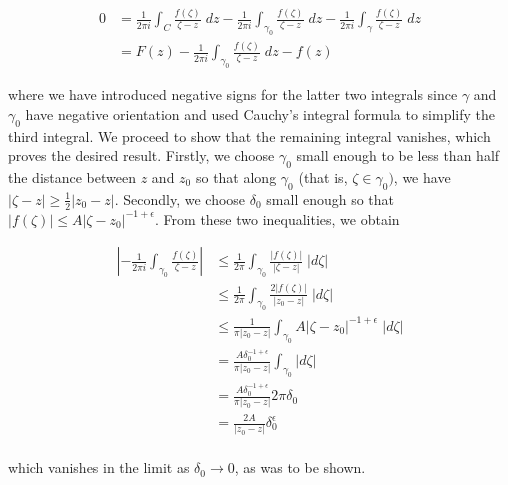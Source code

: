 \begin{solution}
  \begin{align*}
  0 &= \frac{1}{2 \pi i} \int_{C}{\frac{f(\zeta)}{\zeta - z} \; dz} 
     - \frac{1}{2 \pi i} \int_{\gamma_0}{\frac{f(\zeta)}{\zeta - z} \; dz}
     - \frac{1}{2 \pi i} \int_{\gamma}{\frac{f(\zeta)}{\zeta - z} \; dz} \\
    &= F(z) - \frac{1}{2 \pi i} \int_{\gamma_0}{\frac{f(\zeta)}{\zeta - z} \; dz} - f(z)
  \end{align*}

  where we have introduced negative signs for the latter two integrals since $\gamma$ and $\gamma_0$ have negative 
  orientation and used Cauchy's integral formula to simplify the third integral. We proceed to show that the remaining 
  integral vanishes, which proves the desired result. Firstly, we choose $\gamma_0$ small enough to be less than half 
  the distance between $z$ and $z_0$ so that along $\gamma_0$ (that is, $\zeta \in \gamma_0)$, we have 
  $|\zeta - z| \ge \frac{1}{2}|z_0 - z|$. Secondly, we choose $\delta_0$ small enough so that 
  $|f(\zeta)| \le A |\zeta - z_0|^{-1 + \epsilon}$. From these two inequalities, we obtain

  \begin{align*}
    \left| -\frac{1}{2 \pi i} \int_{\gamma_0} \frac{f(\zeta)}{\zeta - z} \right|
    &\le \frac{1}{2 \pi} \int_{\gamma_0} \frac{|f(\zeta)|}{|\zeta - z|} \; |d\zeta| \\
    &\le \frac{1}{2 \pi} \int_{\gamma_0} \frac{2 |f(\zeta)|}{|z_0 - z|} \; |d\zeta| \\
    &\le \frac{1}{\pi |z_0 - z|} \int_{\gamma_0} {A |\zeta - z_0|^{-1 + \epsilon}} \; |d\zeta| \\
    &= \frac{A \delta_0^{-1 + \epsilon}}{\pi |z_0 - z|} \int_{\gamma_0} {|d\zeta|}  \\
    &= \frac{A \delta_0^{-1 + \epsilon}}{\pi |z_0 - z|} 2 \pi \delta_0 \\
    &= \frac{2 A }{|z_0 - z|} \delta_0^{\epsilon} \\
  \end{align*}

  which vanishes in the limit as $\delta_0 \to 0$, as was to be shown.
  \ \\
\end{solution}